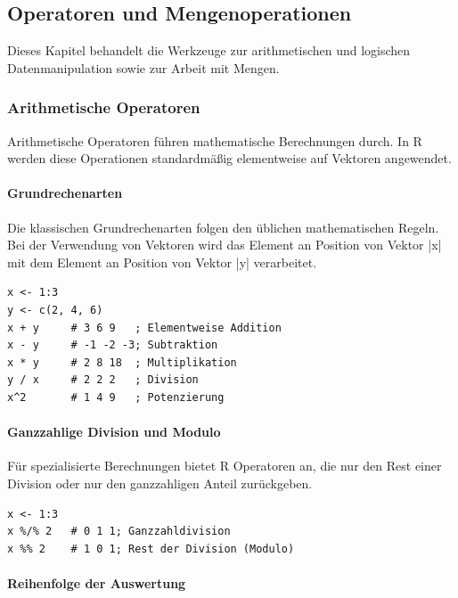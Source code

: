 \documentclass[10pt,twocolumn]{scrartcl}
\renewcommand{\lstinline}{\mycoloredinline}
\begin{document}
\subsection{Operatoren und Mengenoperationen}

Dieses Kapitel behandelt die Werkzeuge zur arithmetischen und logischen Datenmanipulation sowie zur Arbeit mit Mengen.


\subsubsection{Arithmetische Operatoren}

Arithmetische Operatoren führen mathematische Berechnungen durch. In R werden diese Operationen standardmäßig elementweise auf Vektoren angewendet.

\paragraph{Grundrechenarten}

Die klassischen Grundrechenarten folgen den üblichen mathematischen Regeln. Bei der Verwendung von Vektoren wird das Element an Position von Vektor \lstinline|x| mit dem Element an Position von Vektor \lstinline|y| verarbeitet.

\begin{lstlisting}
x <- 1:3
y <- c(2, 4, 6)
x + y     # 3 6 9   ; Elementweise Addition
x - y     # -1 -2 -3; Subtraktion
x * y     # 2 8 18  ; Multiplikation
y / x     # 2 2 2   ; Division
x^2       # 1 4 9   ; Potenzierung
\end{lstlisting}

\paragraph{Ganzzahlige Division und Modulo}

Für spezialisierte Berechnungen bietet R Operatoren an, die nur den Rest einer Division oder nur den ganzzahligen Anteil zurückgeben.

\begin{lstlisting}
x <- 1:3
x %/% 2   # 0 1 1; Ganzzahldivision
x %% 2    # 1 0 1; Rest der Division (Modulo)
\end{lstlisting}

\paragraph{Reihenfolge der Auswertung}
\end{document}

